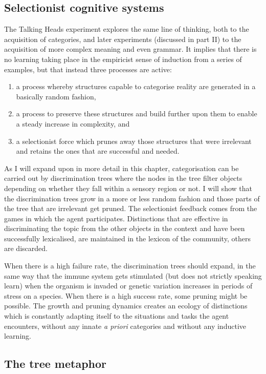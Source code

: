 \subsection{Selectionist cognitive systems}

The Talking Heads experiment explores the same line of thinking, 
both to the acquisition of categories, and later experiments 
(discussed in part II) to the acquisition of more complex meaning 
and even grammar. It implies
that there is no learning taking place in the empiricist sense 
of induction from a series of examples, but that instead 
three processes are active: 
\begin{enumerate}
\item a process whereby structures capable to categorise
reality are generated in a basically random fashion, 
\item a process to preserve these structures and build 
further upon them to enable a steady increase in 
complexity, and 
\item a selectionist force which
prunes away those structures that were irrelevant and 
retains the ones that are successful and needed. 
\end{enumerate}

As I will expand upon in more detail in this 
chapter, categorisation
can be carried out by discrimination trees where the 
nodes in the tree filter objects depending on whether they 
fall within a sensory region or not. I will show that
the discrimination trees grow in a more or
less random fashion and 
those parts of the tree that are irrelevant get pruned. 
The selectionist feedback comes from the games in which 
the agent participates. Distinctions that are effective
in discriminating the topic from the other objects in 
the context and have been successfully lexicalised, 
are maintained in the lexicon of the
community, others are discarded.

When there is a high failure rate, the discrimination trees 
should expand, in the same way that the immune system gets 
stimulated (but does not strictly speaking
learn) when the organism is
invaded or genetic variation increases in periods
of stress on a species. When there is a high
success rate, some pruning
might be possible. The growth and pruning dynamics creates an 
ecology of distinctions which is constantly 
adapting itself to the situations and tasks 
the agent encounters, without any innate {\itshape a priori}
categories and without any inductive learning. 

\subsection{The tree metaphor}

